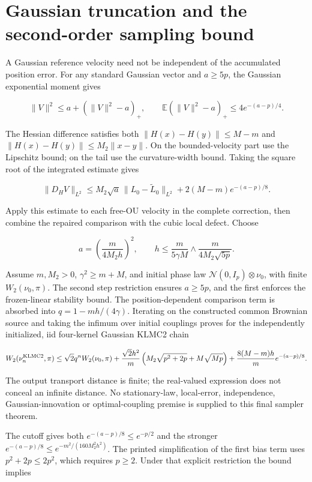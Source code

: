 \documentclass[11pt,a4paper]{report}
\begin{document}
\section{\texorpdfstring{Gaussian truncation and the second-order sampling bound}{Gaussian truncation and the second-order sampling bound}}


A Gaussian reference velocity need not be independent of the accumulated
position error. For any standard Gaussian vector and \(a\ge5p\),
the Gaussian exponential moment gives


\[\|V\|^2\le a+(\|V\|^2-a)_+,\qquad
\mathbb E(\|V\|^2-a)_+\le4e^{-(a-p)/4}.\]


The Hessian difference satisfies both
\(\|H(x)-H(y)\|\le M-m\) and
\(\|H(x)-H(y)\|\le M_2\|x-y\|\). On the bounded-velocity part use
the Lipschitz bound; on the tail use the curvature-width bound. Taking the
square root of the integrated estimate gives


\[\|D_HV\|_{L^2}\le M_2\sqrt a\,\|L_0-\widetilde L_0\|_{L^2}
+2(M-m)e^{-(a-p)/8}.\]


Apply this estimate to each free-OU velocity in the complete
correction, then combine the repaired comparison with the cubic local
defect. Choose


\[a=\left(\frac{m}{4M_2h}\right)^2,\qquad
h\le\frac{m}{5\gamma M}\wedge\frac{m}{4M_2\sqrt{5p}}.\]


Assume \(m,M_2>0\), \(\gamma^2\ge m+M\), and initial phase law
\(\mathcal N(0,I_p)\otimes\nu_0\), with finite \(W_2(\nu_0,\pi)\).
The second step restriction ensures \(a\ge5p\), and the first enforces the
frozen-linear stability bound. The position-dependent comparison term is
absorbed into \(q=1-mh/(4\gamma)\). Iterating on the constructed common
Brownian source and taking the infimum over initial couplings proves
for the independently initialized, iid four-kernel Gaussian KLMC2 chain


\[W_2(\nu_n^{\rm KLMC2},\pi)\le
\sqrt2q^n W_2(\nu_0,\pi)
+\frac{\sqrt2h^2}{m}\left(M_2\sqrt{p^2+2p}+M\sqrt{Mp}\right)
+\frac{8(M-m)h}{m}e^{-(a-p)/8}.\]


The output transport distance is finite; the real-valued expression
does not conceal an infinite distance. No stationary-law, local-error,
independence, Gaussian-innovation or optimal-coupling premise is supplied to
this final sampler theorem.




The cutoff gives both \(e^{-(a-p)/8}\le e^{-p/2}\) and the stronger
\(e^{-(a-p)/8}\le e^{-m^2/(160M_2^2h^2)}\). The printed simplification
of the first bias term uses \(p^2+2p\le2p^2\), which requires
\(p\ge2\). Under that explicit restriction the bound implies
\end{document}
